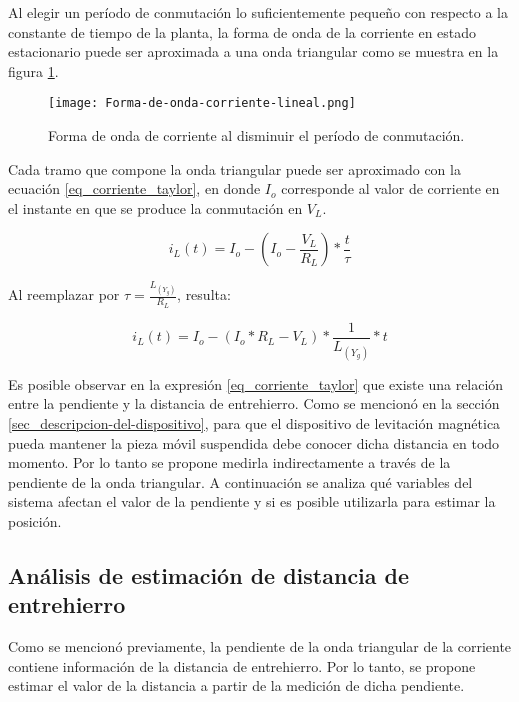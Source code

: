 Al elegir un período de conmutación lo suficientemente pequeño con respecto a la constante de tiempo de la planta, la forma de onda de la corriente en estado estacionario puede ser aproximada a una onda triangular como se muestra en la figura \ref{fig:img_corriente_lineal}. 

\begin{figure}[H]
	\centering
	\texttt{[image: Forma-de-onda-corriente-lineal.png]}
	\caption{Forma de onda de corriente al disminuir el período de conmutación.}
	\label{fig:img_corriente_lineal}
\end{figure}

Cada tramo que compone la onda triangular puede ser aproximado con la ecuación \ref{eq_corriente_taylor}, en donde $I_o$ corresponde al valor de corriente en el instante en que se produce la conmutación en $V_L$.

\begin{equation}
	i_L(t)=I_o -  (I_o-\frac{V_L}{R_L})*\frac{t}{\tau}
\end{equation}

Al reemplazar por $\tau=\frac{L_{(Y_g)}}{R_L}$, resulta:

\begin{equation} \label{eq_corriente_taylor}
	i_L(t)=I_o -  (I_o*R_L-V_L)*\frac{1}{L_{(Y_g)}}*t
\end{equation}

Es posible observar en la expresión \ref{eq_corriente_taylor} que existe una relación entre la pendiente y la distancia de entrehierro. Como se mencionó en la sección \ref{sec_descripcion-del-dispositivo}, para que el dispositivo de levitación magnética pueda mantener la pieza móvil suspendida debe conocer dicha distancia en todo momento. Por lo tanto se propone medirla indirectamente a través de la pendiente de la onda triangular. A continuación se analiza qué variables del sistema afectan el valor de la pendiente y si es posible utilizarla para estimar la posición.

\subsection{Análisis de estimación de distancia de entrehierro} \label{sec_analisis_estimacion}

Como se mencionó previamente, la pendiente de la onda triangular de la corriente contiene información de la distancia de entrehierro. Por lo tanto, se propone estimar el valor de la distancia a partir de la medición de dicha pendiente. 

